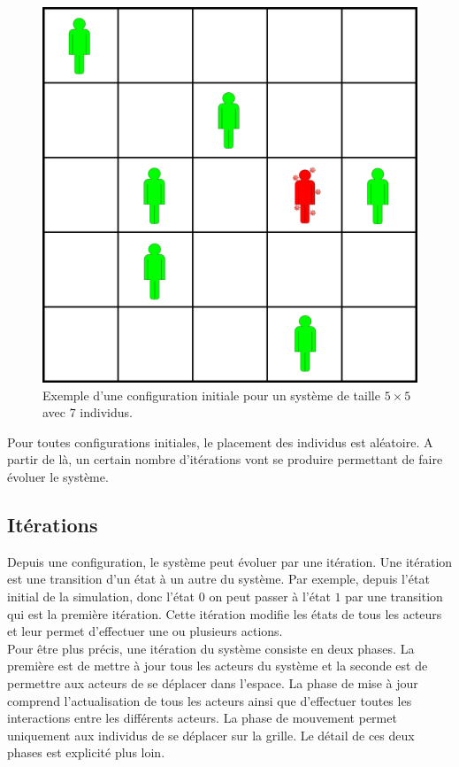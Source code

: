 \begin{figure}[h]
	\centering
	\captionsetup{justification=centering}
	\includegraphics[scale=0.5]{Images/configuration_initiale.png}
	\caption[Configuration initiale]{Exemple d'une configuration initiale pour un système de taille $5\times 5$ avec $7$ individus.}
\end{figure}

Pour toutes configurations initiales, le placement des individus est aléatoire. A partir de là, un certain nombre d'itérations vont se produire permettant de faire évoluer le système.

\subsection{Itérations}

Depuis une configuration, le système peut évoluer par une itération. Une itération est une transition d'un état à un autre du système. Par exemple, depuis l'état initial de la simulation, donc l'état $0$ on peut passer à l'état $1$ par une transition qui est la première itération. Cette itération modifie les états de tous les acteurs et leur permet d'effectuer une ou plusieurs actions.\\

Pour être plus précis, une itération du système consiste en deux phases. La première est de mettre à jour tous les acteurs du système et la seconde est de permettre aux acteurs de se déplacer dans l'espace. La phase de mise à jour comprend l'actualisation de tous les acteurs ainsi que d'effectuer toutes les interactions entre les différents acteurs. La phase de mouvement permet uniquement aux individus de se déplacer sur la grille. Le détail de ces deux phases est explicité plus loin.\\

